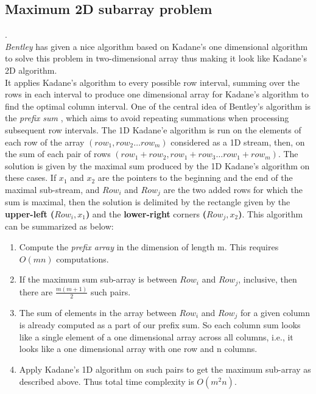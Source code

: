 \subsection{Maximum 2D subarray problem}
\qquad {}.
\vspace{1mm}\\
\emph{Bentley} has given a nice algorithm based on Kadane\rq{}s one dimensional algorithm to solve this problem in two-dimensional array thus making it look like Kadane\rq{}s 2D algorithm.
\vspace{1mm}\\
It applies Kadane\rq{}s algorithm to every possible row interval, summing over the rows in each interval to produce one dimensional array for Kadane\rq{}s algorithm to find the optimal column interval. One of the central idea of Bentley\rq{}s algorithm is the \emph{prefix sum} , which aims to avoid repeating summations when processing subsequent row intervals. The 1D Kadane\rq{}e algorithm is run on the elements of each row of the array $(row_{1}, row_{2} \dots row_{m})$ considered as a 1D stream, then, on the sum of each pair of rows $(row_{1} + row_{2},  row_{1} + row_{3}\dots row_{1}  + row_{m})$. The solution is given by the maximal sum produced by the 1D Kadane\rq{}s algorithm on these cases. If $x_{1}$ and $x_{2}$ are the pointers to the beginning and the end of the maximal sub-stream, and $Row_{i}$ and $Row_{j}$ are the two added rows for which the sum is maximal, then the solution is delimited by the rectangle given by the \textbf{upper-left ($Row_{i}, x_{1}$)} and the \textbf{lower-right} corners \textbf{($Row_{j}, x_{2}$)}.
This algorithm can be summarized as below:
\begin{enumerate}
    \item Compute the \emph{prefix array} in the dimension of length m. This requires $O(mn)$ computations.
    \item If the maximum sum sub-array is between $Row_{i}$ and $Row_{j}$, inclusive, then there are $\frac{m(m + 1)}{2}$ such pairs.
    \item The sum of elements in the array between $Row_{i}$ and $Row_{j}$ for a given column is already computed as a part of our prefix sum. So each column sum looks like a single element of a one dimensional array across all columns, i.e., it looks like a one dimensional array with one row and n columns.
    \item Apply Kadane\rq{}s 1D algorithm on such pairs to get the maximum sub-array as described above. Thus total time complexity is $O(m^{2}n)$.
\end{enumerate}

